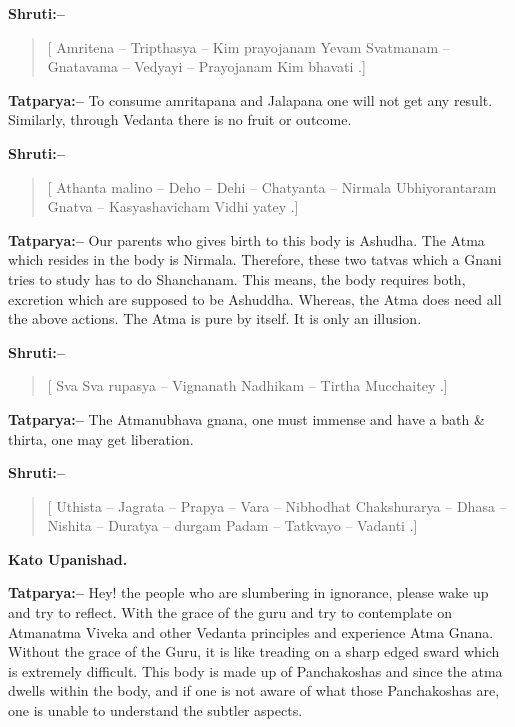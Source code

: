 \textbf{Shruti:–}

\begin{verse}
[ Amritena – Tripthasya – Kim prayojanam  Yevam Svatmanam – Gnatavama – Vedyayi – Prayojanam Kim bhavati .]
\end{verse}

\textbf{Tatparya:–} To consume amritapana and Jalapana one will not get any result. Similarly, through Vedanta there is no fruit or outcome.

\textbf{Shruti:–}

\begin{verse}
[ Athanta malino – Deho – Dehi – Chatyanta – Nirmala  Ubhiyorantaram Gnatva – Kasyashavicham Vidhi yatey .]
\end{verse}

\textbf{Tatparya:–} Our parents who gives birth to this body is Ashudha. The Atma which resides in the body is Nirmala. Therefore, these two tatvas which a Gnani tries to study has to do Shanchanam. This means, the body requires both, excretion which are supposed to be Ashuddha. Whereas, the Atma does need all the above actions. The Atma is pure by itself. It is only an illusion.

\textbf{Shruti:–}

\begin{verse}
[ Sva Sva rupasya – Vignanath Nadhikam – Tirtha Mucchaitey .]
\end{verse}

\textbf{Tatparya:–} The Atmanubhava gnana, one must immense and have a bath \& thirta, one may get liberation.

\textbf{Shruti:–}

\begin{verse}
[ Uthista – Jagrata – Prapya – Vara – Nibhodhat  Chakshurarya – Dhasa – Nishita – Duratya – durgam Padam – Tatkvayo – Vadanti .]
\end{verse}

\begin{flushright}
\textbf{Kato Upanishad.}
\end{flushright}

\textbf{Tatparya:–} Hey! the people who are slumbering in ignorance, please wake up and try to reflect. With the grace of the guru and try to contemplate on Atmanatma Viveka and other Vedanta principles and experience Atma Gnana. Without the grace of the Guru, it is like treading on a sharp edged sward which is extremely difficult. This body is made up of Panchakoshas and since the atma dwells within the body, and if one is not aware of what those Panchakoshas are, one is unable to understand the subtler aspects.


